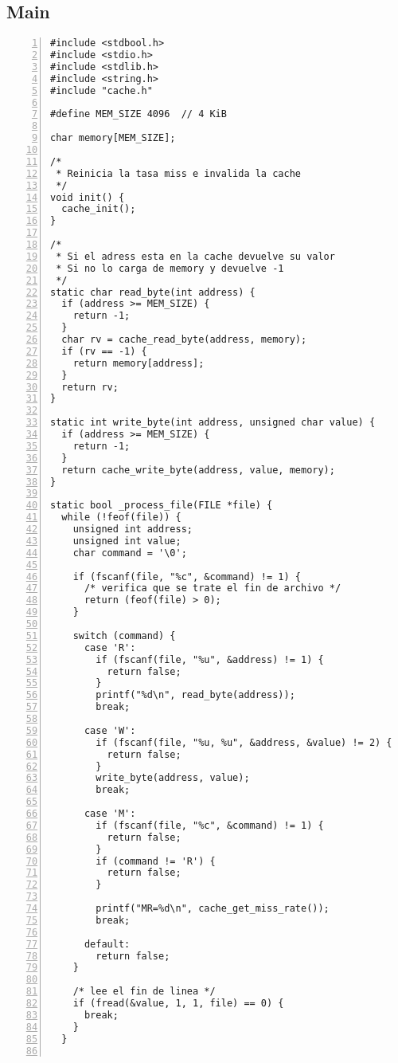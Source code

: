 \documentclass[11pt,a4paper, spanish]{article}
\begin{document}
\subsection{Main}

\begin{lstlisting}[numbers=left, tabsize=2, basicstyle=\fontsize{11}{13}\ttfamily, frame=single, caption={makefile}]
#include <stdbool.h>
#include <stdio.h>
#include <stdlib.h>
#include <string.h>
#include "cache.h"

#define MEM_SIZE 4096  // 4 KiB

char memory[MEM_SIZE];

/*
 * Reinicia la tasa miss e invalida la cache
 */
void init() {
  cache_init();
}

/*
 * Si el adress esta en la cache devuelve su valor
 * Si no lo carga de memory y devuelve -1
 */
static char read_byte(int address) {
  if (address >= MEM_SIZE) {
    return -1;
  }
  char rv = cache_read_byte(address, memory);
  if (rv == -1) {
    return memory[address];
  }
  return rv;
}

static int write_byte(int address, unsigned char value) {
  if (address >= MEM_SIZE) {
    return -1;
  }
  return cache_write_byte(address, value, memory);
}

static bool _process_file(FILE *file) {
  while (!feof(file)) {
    unsigned int address;
    unsigned int value;
    char command = '\0';

    if (fscanf(file, "%c", &command) != 1) {
      /* verifica que se trate el fin de archivo */
      return (feof(file) > 0);
    }

    switch (command) {
      case 'R':
        if (fscanf(file, "%u", &address) != 1) {
          return false;
        }
        printf("%d\n", read_byte(address));
        break;

      case 'W':
        if (fscanf(file, "%u, %u", &address, &value) != 2) {
          return false;
        }
        write_byte(address, value);
        break;

      case 'M':
        if (fscanf(file, "%c", &command) != 1) {
          return false;
        }
        if (command != 'R') {
          return false;
        }

        printf("MR=%d\n", cache_get_miss_rate());
        break;

      default:
        return false;
    }

    /* lee el fin de linea */
    if (fread(&value, 1, 1, file) == 0) {
      break;
    }
  }


\end{lstlisting}
\end{document}
